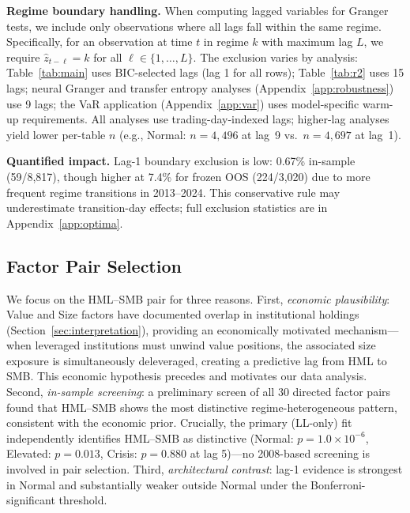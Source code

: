 \documentclass[sigconf,anonymous]{acmart}
\begin{document}
\textbf{Regime boundary handling.} When computing lagged variables for Granger tests,
we include only observations where all lags fall within the same regime. Specifically,
for an observation at time $t$ in regime $k$ with maximum lag $L$, we require
$\hat{z}_{t-\ell} = k$ for all $\ell \in \{1, \ldots, L\}$. The exclusion varies
by analysis: Table~\ref{tab:main} uses BIC-selected lags (lag 1 for all rows);
Table~\ref{tab:r2} uses 15 lags; neural Granger and transfer entropy analyses
(Appendix~\ref{app:robustness}) use 9 lags; the VaR application
(Appendix~\ref{app:var}) uses model-specific warm-up requirements.
All analyses use trading-day-indexed lags; higher-lag analyses yield lower per-table $n$
(e.g., Normal: $n = 4{,}496$ at lag~9 vs.\ $n = 4{,}697$ at lag~1).

\textbf{Quantified impact.} Lag-1 boundary exclusion is low: 0.67\% in-sample (59/8,817),
though higher at 7.4\% for frozen OOS (224/3,020) due to more frequent
regime transitions in 2013--2024. This conservative rule may underestimate
transition-day effects; full exclusion statistics are in Appendix~\ref{app:optima}.

\subsection{Factor Pair Selection}
\label{sec:pairselection}

We focus on the HML--SMB pair for three reasons. First, \emph{economic
plausibility}: Value and Size factors have documented overlap in institutional
holdings (Section~\ref{sec:interpretation}), providing an economically motivated
mechanism---when leveraged institutions must unwind value positions, the associated
size exposure is simultaneously deleveraged, creating a predictive lag from HML
to SMB. This economic hypothesis precedes and motivates our data analysis.
Second, \emph{in-sample screening}: a preliminary screen of all 30 directed
factor pairs found that HML--SMB shows the most distinctive regime-heterogeneous
pattern, consistent with the economic prior. Crucially, the primary (LL-only) fit
independently identifies HML--SMB as distinctive (Normal: $p = 1.0 \times 10^{-6}$,
Elevated: $p = 0.013$, Crisis: $p = 0.880$ at lag 5)---no 2008-based screening is
involved in pair selection.
Third, \emph{architectural contrast}: lag-1 evidence is strongest in Normal and
substantially weaker outside Normal under the Bonferroni-significant threshold.
\end{document}
